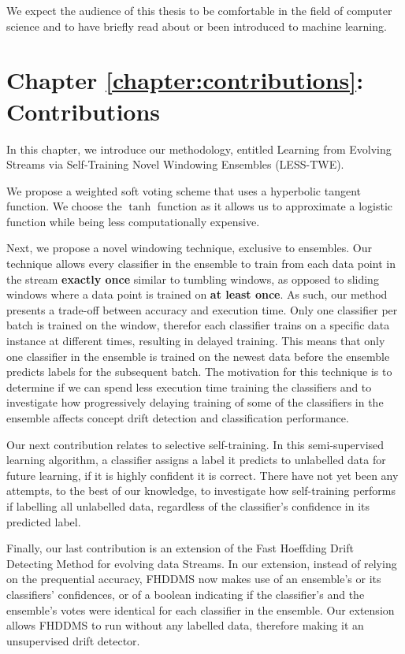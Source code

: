 We expect the audience of this thesis to be comfortable in the field of computer science and to have briefly read about or been introduced to machine learning.

\section{Chapter \ref{chapter:contributions}: Contributions}
In this chapter, we introduce our methodology, entitled Learning from Evolving Streams via Self-Training Novel Windowing Ensembles (LESS-TWE).

We propose a weighted soft voting scheme that uses a hyperbolic tangent function. We choose the $\tanh$ function as it allows us to approximate a logistic function while being less computationally expensive.

Next, we propose a novel windowing technique, exclusive to ensembles. Our technique allows every classifier in the ensemble to train from each data point in the stream \textbf{exactly once} similar to tumbling windows, as opposed to sliding windows where a data point is trained on \textbf{at least once}. As such, our method presents a trade-off between accuracy and execution time. Only one classifier per batch is trained on the window, therefor each classifier trains on a specific data instance at different times, resulting in delayed training. This means that only one classifier in the ensemble is trained on the newest data before the ensemble predicts labels for the subsequent batch.
The motivation for this technique is to determine if we can spend less execution time training the classifiers and to investigate how progressively delaying training of some of the classifiers in the ensemble affects concept drift detection and classification performance.

Our next contribution relates to selective self-training. In this semi-supervised learning algorithm, a classifier assigns a label it predicts to unlabelled data for future learning, if it is highly confident it is correct. There have not yet been any attempts, to the best of our knowledge, to investigate how self-training performs if labelling all unlabelled data, regardless of the classifier's confidence in its predicted label.

Finally, our last contribution is an extension of the Fast Hoeffding Drift Detecting Method for evolving data Streams. In our extension, instead of relying on the prequential accuracy, FHDDMS now makes use of an ensemble's or its classifiers' confidences, or of a boolean indicating if the classifier's and the ensemble's votes were identical for each classifier in the ensemble. Our extension allows FHDDMS to run without any labelled data, therefore making it an unsupervised drift detector.

